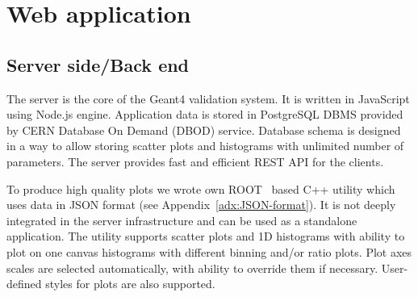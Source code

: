 \section{Web application}
\label{sec-webapplication}

\subsection{Server side/Back end}
\label{sec-webapplication-server}

The server is the core of the Geant4 validation system.
It is written in JavaScript using Node.js engine. Application data is stored in PostgreSQL DBMS provided by CERN Database On Demand (DBOD) service. Database schema is designed in a way to allow storing scatter plots and histograms with unlimited number of parameters. The server provides fast and efficient REST API for the clients.

To produce high quality plots we wrote own ROOT~\cite{ROOT} based C++ utility which uses data in JSON format (see Appendix~\ref{adx:JSON-format}). It is not deeply integrated in the server infrastructure and can be used as a standalone application. The utility supports scatter plots and 1D histograms with ability to plot on one canvas histograms with different binning and/or ratio plots. Plot axes scales are selected automatically, with ability to override them if necessary. User-defined styles for plots are also supported.


